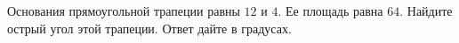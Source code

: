 \begin{ex}
	\begin{condition}
		Основания прямоугольной трапеции равны \( 12  \) и \( 4 \). Ее площадь равна \( 64 \). Найдите острый угол этой трапеции. Ответ дайте в градусах.
	\end{condition}
\end{ex}